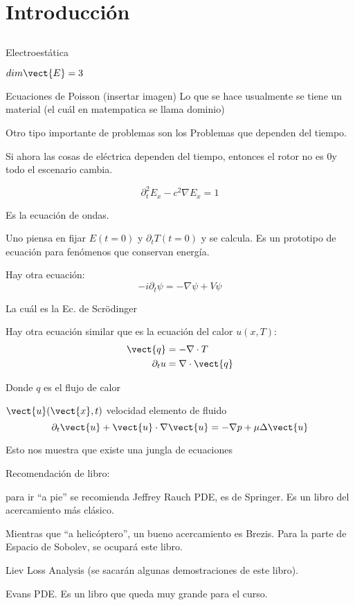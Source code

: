 \chapter{Introducción}

\section{}
Electroestática

$dim \vect{E} = 3$ 

Ecuaciones de Poisson
(insertar imagen)
Lo que se hace usualmente se tiene un material (el cuál en matempatica se llama dominio)

Otro tipo importante de problemas son los Problemas que dependen del tiempo.

Si ahora las cosas de eléctrica dependen del tiempo, entonces el rotor no es 0y todo el escenario cambia.

\begin{example}
\begin{equation}
    \partial_t^2 E_x - c^2 \nabla E_x = 1
\end{equation}


Es la ecuación de ondas.

Uno piensa en fijar $E(t=0)$ y $\partial_t T(t=0)$ y se calcula. Es un prototipo de ecuación para fenómenos que conservan energía.

Hay otra ecuación:
\begin{equation}
    -i \partial_t \psi = - \nabla \psi + V \psi
\end{equation}

La cuál es la Ec. de Scrödinger

Hay otra ecuación similar que es la ecuación del calor $u(x, T)$:
\begin{eqnarray}
    \vect{q} 
    &= 
    - {\nabla} 
    \cdot T\\
    \partial_t u &= \nabla \cdot \vect{q}
\end{eqnarray}

Donde $q$ es el flujo de calor

$\vect{u} (\vect{x}, t)$ velocidad elemento de fluido
\begin{equation}
    \partial_t \vect{u} + \vect{u} \cdot \nabla \vect{u} = - \nabla p + \mu \Delta \vect{u}
\end{equation}

Esto nos muestra que existe una jungla de ecuaciones

Recomendación de libro:

para ir ``a pie'' se recomienda Jeffrey Rauch PDE, es de Springer. Es un libro del acercamiento más clásico.

Mientras que ``a helicóptero'', un bueno acercamiento es Brezis. Para la parte de Espacio de Sobolev, se ocupará este libro.

Liev Loss Analysis (se sacarán algunas demostraciones de este libro).

Evans PDE. Es un libro que queda muy grande para el curso.

\end{example}

